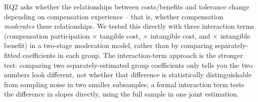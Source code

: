 RQ2 asks whether the relationships between costs/benefits and tolerance
change depending on compensation experience -- that is, whether compensation
\emph{moderates} these relationships. We tested this directly with three
interaction terms (compensation participation $\times$ tangible cost,
$\times$ intangible cost, and $\times$ intangible benefit) in a two-stage
moderation model, rather than by comparing separately-fitted coefficients in
each group. The interaction-term approach is the stronger test: comparing two
separately-estimated group coefficients only tells you the two numbers look
different, not whether that difference is statistically distinguishable from
sampling noise in two smaller subsamples; a formal interaction term tests the
difference in slopes directly, using the full sample in one joint estimation.

